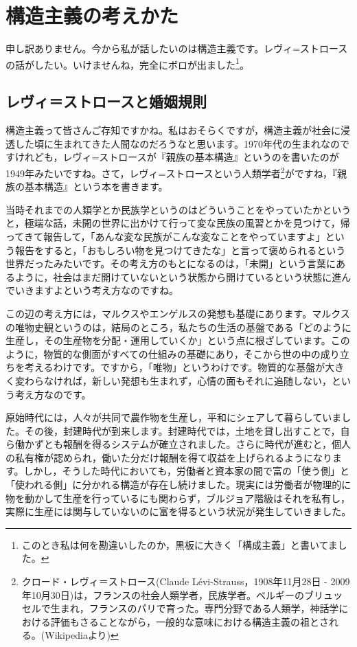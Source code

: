 \documentclass{ltjsbook}
\begin{document}
\section{構造主義の考えかた}
申し訳ありません。今から私が話したいのは構造主義です。レヴィ=ストロースの話がしたい。いけませんね，完全にボロが出ました\footnote{このとき私は何を勘違いしたのか，黒板に大きく「構成主義」と書いてました。}。
\subsection{レヴィ＝ストロースと婚姻規則}
構造主義って皆さんご存知ですかね。私はおそらくですが，構造主義が社会に浸透した頃に生まれてきた人間なのだろうなと思います。1970年代の生まれなのですけれども，レヴィ=ストロースが『親族の基本構造』というのを書いたのが1949年みたいですね。さて，レヴィ=ストロースという人類学者\footnote{クロード・レヴィ＝ストロース(Claude L\'{e}vi-Strauss，1908年11月28日 - 2009年10月30日)は，フランスの社会人類学者，民族学者。ベルギーのブリュッセルで生まれ，フランスのパリで育った。専門分野である人類学，神話学における評価もさることながら，一般的な意味における構造主義の祖とされる。(Wikipediaより)}がですね，『親族の基本構造』という本を書きます。

当時それまでの人類学とか民族学というのはどういうことをやっていたかというと，極端な話，未開の世界に出かけて行って変な民族の風習とかを見つけて，帰ってきて報告して，「あんな変な民族がこんな変なことをやっていますよ」という報告をすると，「おもしろい物を見つけてきたな」と言って褒められるという世界だったみたいです。その考え方のもとになるのは，「未開」という言葉にあるように，社会はまだ開けていないという状態から開けているという状態に進んでいきますよという考え方なのですね。

この辺の考え方には，マルクスやエンゲルスの発想も基礎にあります。マルクスの唯物史観というのは，結局のところ，私たちの生活の基盤である「どのように生産し，その生産物を分配・運用していくか」という点に根ざしています。このように，物質的な側面がすべての仕組みの基礎にあり，そこから世の中の成り立ちを考えるわけです。ですから，「唯物」というわけです。物質的な基盤が大きく変わらなければ，新しい発想も生まれず，心情の面もそれに追随しない，という考え方なのです。

原始時代には，人々が共同で農作物を生産し，平和にシェアして暮らしていました。その後，封建時代が到来します。封建時代では，土地を貸し出すことで，自ら働かずとも報酬を得るシステムが確立されました。さらに時代が進むと，個人の私有権が認められ，働いた分だけ報酬を得て収益を上げられるようになります。しかし，そうした時代においても，労働者と資本家の間で富の「使う側」と「使われる側」に分かれる構造が存在し続けました。現実には労働者が物理的に物を動かして生産を行っているにも関わらず，ブルジョア階級はそれを私有し，実際に生産には関与していないのに富を得るという状況が発生していきました。
\end{document}
